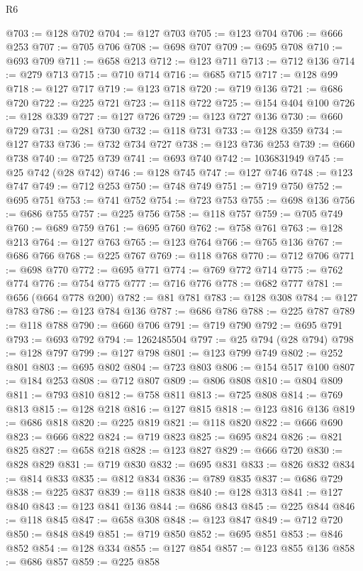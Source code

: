 \begin{lexlean}{R6}
\begin{coremodule}
@703 := @128 @702
@704 := @127 @703
@705 := @123 @704
@706 := @666 @253
@707 := @705 @706
@708 := @698 @707
@709 := @695 @708
@710 := @693 @709
@711 := @658 @213
@712 := @123 @711
@713 := @712 @136
@714 := @279 @713
@715 := @710 @714
@716 := @685 @715
@717 := @128 @99
@718 := @127 @717
@719 := @123 @718
@720 := @719 @136
@721 := @686 @720
@722 := @225 @721
@723 := @118 @722
@725 := @154 @404 @100
@726 := @128 @339
@727 := @127 @726
@729 := @123 @727 @136
@730 := @660 @729
@731 := @281 @730
@732 := @118 @731
@733 := @128 @359
@734 := @127 @733
@736 := @732 @734 @727
@738 := @123 @736 @253
@739 := @660 @738
@740 := @725 @739
@741 := @693 @740
@742 := 1036831949
@745 := @25 @742 (@28 @742)
@746 := @128 @745
@747 := @127 @746
@748 := @123 @747
@749 := @712 @253
@750 := @748 @749
@751 := @719 @750
@752 := @695 @751
@753 := @741 @752
@754 := @723 @753
@755 := @698 @136
@756 := @686 @755
@757 := @225 @756
@758 := @118 @757
@759 := @705 @749
@760 := @689 @759
@761 := @695 @760
@762 := @758 @761
@763 := @128 @213
@764 := @127 @763
@765 := @123 @764
@766 := @765 @136
@767 := @686 @766
@768 := @225 @767
@769 := @118 @768
@770 := @712 @706
@771 := @698 @770
@772 := @695 @771
@774 := @769 @772 @714
@775 := @762 @774
@776 := @754 @775
@777 := @716 @776
@778 := @682 @777
@781 := @656 (@664 @778 @200)
@782 := @81 @781
@783 := @128 @308
@784 := @127 @783
@786 := @123 @784 @136
@787 := @686 @786
@788 := @225 @787
@789 := @118 @788
@790 := @660 @706
@791 := @719 @790
@792 := @695 @791
@793 := @693 @792
@794 := 1262485504
@797 := @25 @794 (@28 @794)
@798 := @128 @797
@799 := @127 @798
@801 := @123 @799 @749
@802 := @252 @801
@803 := @695 @802
@804 := @723 @803
@806 := @154 @517 @100
@807 := @184 @253
@808 := @712 @807
@809 := @806 @808
@810 := @804 @809
@811 := @793 @810
@812 := @758 @811
@813 := @725 @808
@814 := @769 @813
@815 := @128 @218
@816 := @127 @815
@818 := @123 @816 @136
@819 := @686 @818
@820 := @225 @819
@821 := @118 @820
@822 := @666 @690
@823 := @666 @822
@824 := @719 @823
@825 := @695 @824
@826 := @821 @825
@827 := @658 @218
@828 := @123 @827
@829 := @666 @720
@830 := @828 @829
@831 := @719 @830
@832 := @695 @831
@833 := @826 @832
@834 := @814 @833
@835 := @812 @834
@836 := @789 @835
@837 := @686 @729
@838 := @225 @837
@839 := @118 @838
@840 := @128 @313
@841 := @127 @840
@843 := @123 @841 @136
@844 := @686 @843
@845 := @225 @844
@846 := @118 @845
@847 := @658 @308
@848 := @123 @847
@849 := @712 @720
@850 := @848 @849
@851 := @719 @850
@852 := @695 @851
@853 := @846 @852
@854 := @128 @334
@855 := @127 @854
@857 := @123 @855 @136
@858 := @686 @857
@859 := @225 @858

\end{coremodule}
\end{lexlean}
